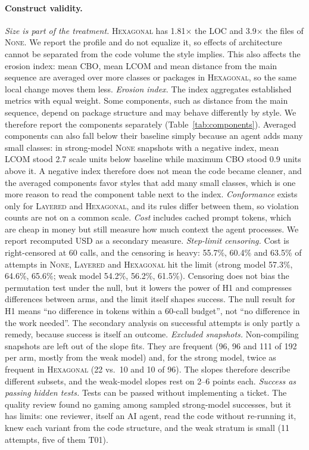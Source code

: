\documentclass[10pt]{article}
\newcommand{\NONE}{\textsc{None}}
\newcommand{\LAY}{\textsc{Layered}}
\newcommand{\HEX}{\textsc{Hexagonal}}
\begin{document}
\paragraph{Construct validity.}
\emph{Size is part of the treatment.} \HEX{} has 1.81$\times$ the LOC and 3.9$\times$ the files of
\NONE. We report the profile and do not equalize it, so effects of architecture cannot be
separated from the code volume the style implies. This also affects the erosion index: mean CBO,
mean LCOM and mean distance from the main sequence are averaged over more classes or packages in
\HEX, so the same local change moves them less. \emph{Erosion index.} The index aggregates
established metrics with equal weight. Some components, such as distance from the main sequence,
depend on package structure and may behave differently by style. We therefore report the
components separately (Table~\ref{tab:components}). Averaged components can also fall below their
baseline simply because an agent adds many small classes: in strong-model \NONE{} snapshots with a
negative index, mean LCOM stood 2.7 scale units below baseline while maximum CBO stood 0.9 units
above it. A negative index therefore does not mean the code became cleaner, and the averaged
components favor styles that add many small classes, which is one more reason to read the
component table next to the index. \emph{Conformance} exists only for \LAY{} and
\HEX{}, and its rules differ between them, so violation counts are not on a common scale.
\emph{Cost} includes cached prompt tokens, which are cheap in money but still measure how much
context the agent processes. We report recomputed USD as a secondary measure. \emph{Step-limit
censoring.} Cost is right-censored at 60 calls, and the censoring is heavy: 55.7\%, 60.4\% and
63.5\% of attempts in \NONE, \LAY{} and \HEX{} hit the limit (strong model 57.3\%, 64.6\%, 65.6\%;
weak model 54.2\%, 56.2\%, 61.5\%). Censoring does not bias the permutation test under the null,
but it lowers the power of H1 and compresses differences between arms, and the limit itself shapes
success. The null result for H1 means ``no difference in tokens within a 60-call budget'', not
``no difference in the work needed''. The secondary analysis on successful attempts is only partly
a remedy, because success is itself an outcome. \emph{Excluded snapshots.} Non-compiling snapshots
are left out of the slope fits. They are frequent (96, 96 and 111 of 192 per arm, mostly from the
weak model) and, for the strong model, twice as frequent in \HEX{} (22 vs.\ 10 and 10 of 96). The
slopes therefore describe different subsets, and the weak-model slopes rest on 2--6 points each.
\emph{Success as passing hidden tests.} Tests can be passed without implementing a ticket. The
quality review found no gaming among sampled strong-model successes, but it has limits: one
reviewer, itself an AI agent, read the code without re-running it, knew each variant from the code
structure, and the weak stratum is small (11 attempts, five of them T01).
\end{document}

